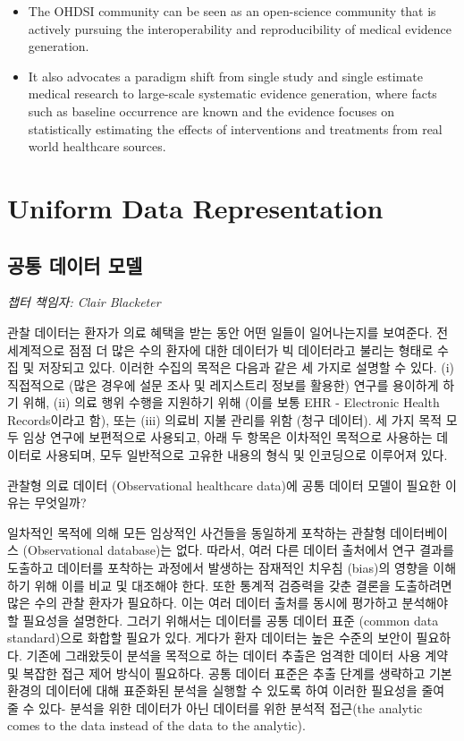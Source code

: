 \documentclass[11pt]{book}
\theoremstyle{definition}
\theoremstyle{definition}
\theoremstyle{definition}
\theoremstyle{remark}
\let\BeginKnitrBlock\begin \let\EndKnitrBlock\end
\begin{document}
\BeginKnitrBlock{rmdsummary}
\begin{itemize}
\item
  The OHDSI community can be seen as an open-science community that is
  actively pursuing the interoperability and reproducibility of medical
  evidence generation.
\item
  It also advocates a paradigm shift from single study and single
  estimate medical research to large-scale systematic evidence
  generation, where facts such as baseline occurrence are known and the
  evidence focuses on statistically estimating the effects of
  interventions and treatments from real world healthcare sources.
\end{itemize}
\EndKnitrBlock{rmdsummary}

\part{Uniform Data
Representation}\label{part-uniform-data-representation}

\chapter{공통 데이터 모델}\label{CommonDataModel}

\emph{챕터 책임자: Clair Blacketer}

관찰 데이터는 환자가 의료 혜택을 받는 동안 어떤 일들이 일어나는지를
보여준다. 전 세계적으로 점점 더 많은 수의 환자에 대한 데이터가 빅
데이터라고 불리는 형태로 수집 및 저장되고 있다. 이러한 수집의 목적은
다음과 같은 세 가지로 설명할 수 있다. (i) 직접적으로 (많은 경우에 설문
조사 및 레지스트리 정보를 활용한) 연구를 용이하게 하기 위해, (ii) 의료
행위 수행을 지원하기 위해 (이를 보통 EHR - Electronic Health
Records이라고 함), 또는 (iii) 의료비 지불 관리를 위함 (청구 데이터). 세
가지 목적 모두 임상 연구에 보편적으로 사용되고, 아래 두 항목은 이차적인
목적으로 사용하는 데이터로 사용되며, 모두 일반적으로 고유한 내용의 형식
및 인코딩으로 이루어져 있다. 

관찰형 의료 데이터 (Observational healthcare data)에 공통 데이터 모델이
필요한 이유는 무엇일까?

일차적인 목적에 의해 모든 임상적인 사건들을 동일하게 포착하는 관찰형
데이터베이스 (Observational database)는 없다. 따라서, 여러 다른 데이터
출처에서 연구 결과를 도출하고 데이터를 포착하는 과정에서 발생하는
잠재적인 치우침 (bias)의 영향을 이해하기 위해 이를 비교 및 대조해야
한다. 또한 통계적 검증력을 갖춘 결론을 도출하려면 많은 수의 관찰 환자가
필요하다. 이는 여러 데이터 출처를 동시에 평가하고 분석해야 할 필요성을
설명한다. 그러기 위해서는 데이터를 공통 데이터 표준 (common data
standard)으로 화합할 필요가 있다. 게다가 환자 데이터는 높은 수준의
보안이 필요하다. 기존에 그래왔듯이 분석을 목적으로 하는 데이터 추출은
엄격한 데이터 사용 계약 및 복잡한 접근 제어 방식이 필요하다. 공통 데이터
표준은 추출 단계를 생략하고 기본 환경의 데이터에 대해 표준화된 분석을
실행할 수 있도록 하여 이러한 필요성을 줄여 줄 수 있다- 분석을 위한
데이터가 아닌 데이터를 위한 분석적 접근(the analytic comes to the data
instead of the data to the analytic).
\end{document}
